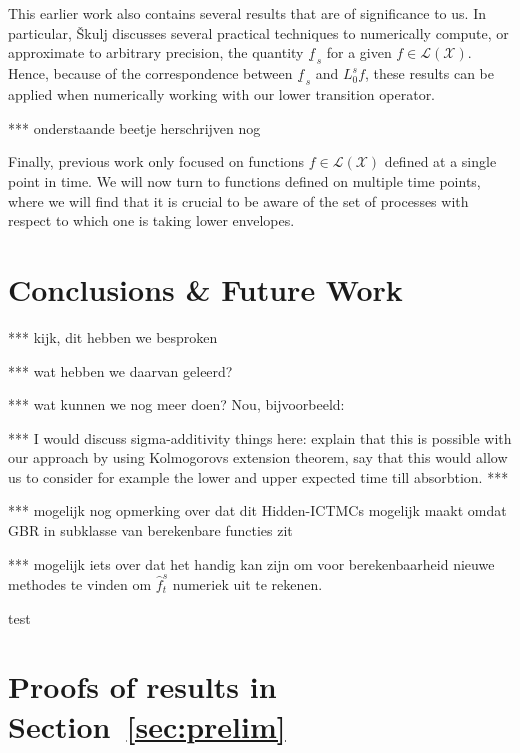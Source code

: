 \documentclass[10pt]{paper}
\theoremstyle{definition}
\newcommand{\states}{\mathcal{X}}
\newcommand{\gambles}{\mathcal{L}}
\newcommand{\gamblesX}{\gambles(\states)}
\begin{document}
This earlier work also contains several results that are of significance to us. In particular, {\v{S}}kulj discusses several practical techniques to numerically compute, or approximate to arbitrary precision, the quantity $\underline{f}_{\,s}$ for a given $f\in\gamblesX$. Hence, because of the correspondence between $\underline{f}_{\,s}$ and $L_0^sf$, these results can be applied when numerically working with our lower transition operator.

*** onderstaande beetje herschrijven nog

Finally, previous work only focused on functions $f\in\gamblesX$ defined at a single point in time. We will now turn to functions defined on multiple time points, where we will find that it is crucial to be aware of the set of processes with respect to which one is taking lower envelopes.

\section{Conclusions \& Future Work}\label{sec:conclusions}

*** kijk, dit hebben we besproken

*** wat hebben we daarvan geleerd?

*** wat kunnen we nog meer doen? Nou, bijvoorbeeld:

*** I would discuss sigma-additivity things here: explain that this is possible with our approach by using Kolmogorovs extension theorem, say that this would allow us to consider for example the lower and upper expected time till absorbtion. ***

*** mogelijk nog opmerking over dat dit Hidden-ICTMCs mogelijk maakt omdat GBR in subklasse van berekenbare functies zit

*** mogelijk iets over dat het handig kan zijn om voor berekenbaarheid nieuwe methodes te vinden om $\hat{f}_t^s$ numeriek uit te rekenen.


 


\appendix

test

\section{Proofs of results in Section~\ref{sec:prelim}}\label{app:prelim}
\end{document}
